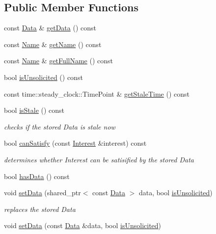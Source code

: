 \subsection*{Public Member Functions}
\begin{DoxyCompactItemize}
\item 
const \hyperlink{classndn_1_1Data}{Data} \& \hyperlink{classnfd_1_1cs_1_1Entry_ad07761f254df27a65f12903837f25f48}{get\+Data} () const
\item 
const \hyperlink{classndn_1_1Name}{Name} \& \hyperlink{classnfd_1_1cs_1_1Entry_a3c002cb1d9ab3e804fb242d1baf98b25}{get\+Name} () const
\item 
const \hyperlink{classndn_1_1Name}{Name} \& \hyperlink{classnfd_1_1cs_1_1Entry_a0b5dda37c72afa623f62071d4a2fce25}{get\+Full\+Name} () const
\item 
bool \hyperlink{classnfd_1_1cs_1_1Entry_ae2decf9b1c986c0d894968fe633ee95f}{is\+Unsolicited} () const
\item 
const time\+::steady\+\_\+clock\+::\+Time\+Point \& \hyperlink{classnfd_1_1cs_1_1Entry_a18be8959593dbcf20eaa3ed0e4e7c48a}{get\+Stale\+Time} () const
\item 
bool \hyperlink{classnfd_1_1cs_1_1Entry_a956594f585dd8bdc464270fea6084c4b}{is\+Stale} () const
\begin{DoxyCompactList}\small\item\em checks if the stored Data is stale now \end{DoxyCompactList}\item 
bool \hyperlink{classnfd_1_1cs_1_1Entry_a536d64b48509ce5d5ce12294d8646bda}{can\+Satisfy} (const \hyperlink{classndn_1_1Interest}{Interest} \&interest) const
\begin{DoxyCompactList}\small\item\em determines whether Interest can be satisified by the stored Data \end{DoxyCompactList}\item 
bool \hyperlink{classnfd_1_1cs_1_1Entry_af65826aa276c0fe8290f2ea1294069f6}{has\+Data} () const
\item 
void \hyperlink{classnfd_1_1cs_1_1Entry_a7e5c537136097a6dfd7797452149efd2}{set\+Data} (shared\+\_\+ptr$<$ const \hyperlink{classndn_1_1Data}{Data} $>$ data, bool \hyperlink{classnfd_1_1cs_1_1Entry_ae2decf9b1c986c0d894968fe633ee95f}{is\+Unsolicited})\hypertarget{classnfd_1_1cs_1_1Entry_a7e5c537136097a6dfd7797452149efd2}{}\label{classnfd_1_1cs_1_1Entry_a7e5c537136097a6dfd7797452149efd2}

\begin{DoxyCompactList}\small\item\em replaces the stored Data \end{DoxyCompactList}\item 
void \hyperlink{classnfd_1_1cs_1_1Entry_ab88eac53ccb658a6593255d35d24c7f4}{set\+Data} (const \hyperlink{classndn_1_1Data}{Data} \&data, bool \hyperlink{classnfd_1_1cs_1_1Entry_ae2decf9b1c986c0d894968fe633ee95f}{is\+Unsolicited})\hypertarget{classnfd_1_1cs_1_1Entry_ab88eac53ccb658a6593255d35d24c7f4}{}\label{classnfd_1_1cs_1_1Entry_ab88eac53ccb658a6593255d35d24c7f4}


\end{DoxyCompactItemize}
